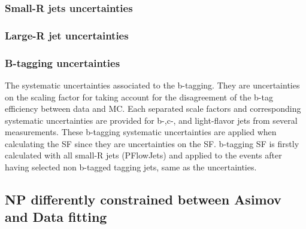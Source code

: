 \subsubsection{Small-R jets uncertainties}
\subsubsection{Large-R jet uncertainties}
\subsubsection{B-tagging uncertainties}
The systematic uncertainties associated to the b-tagging.
They are uncertainties on the scaling factor for taking account for the disagreement of the b-tag efficiency between data and MC. Each separated scale factors and corresponding systematic uncertainties are provided for b-,c-, and light-flavor jets from several measurements.
These b-tagging systematic uncertainties are applied when calculating the SF since they are uncertainties on the SF. b-tagging SF is firstly calculated with all small-R jets (PFlowJets) and applied to the events after having selected non b-tagged tagging jets, same as the uncertainties. 



\subsection{NP differently constrained between Asimov and Data fitting}
